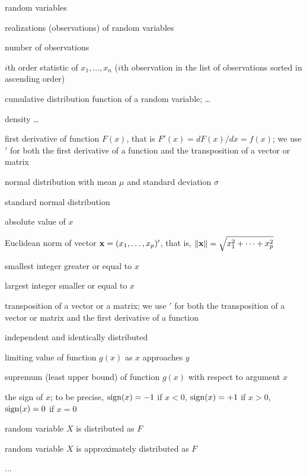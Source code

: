 \begin{description}[leftmargin=6em,style=nextline]
    \item[$X, Y, Z, \dots$]
        random variables
    \item[$x_i, y_i, z_i, \dots$]
        realizations (observations) of random variables
    \item[$n$]
        number of observations
    \item[$x_{(i)}$]
        $i$th order statistic of $x_1, \dots, x_n$ ($i$th observation in the list of observations sorted in ascending order)
    \item[$F(x)$]
        cumulative distribution function of a random variable; \dots
    \item[$f(x)$]
        density \dots
    \item[$F'(x)$]
        first derivative of function $F(x)$, that is $F'(x) = dF(x)/dx = f(x)$;
        we use $'$ for both the first derivative of a function and the
        transposition of a vector or matrix
    \item[$\mathcal{N}(\mu, \sigma)$]
        normal distribution with mean $\mu$ and standard deviation $\sigma$
    \item[$\mathcal{N}(0, 1)$]
        standard normal distribution
    \item[$|x|$]
        absolute value of $x$
    \item[$\Vert\stvec{x}\Vert$]
        Euclidean norm of vector $\mathbf x = (x_1, \dots, x_p)'$, that is, $\Vert\mathbf x\Vert = \sqrt{x_1^2 + \dots + x_p^2}$
    \item[$\lceil x \rceil$]
        smallest integer greater or equal to $x$
    \item[$\lfloor x \rfloor$] 
        largest integer smaller or equal to $x$
    \item[$\stvec{x}'$, $\stmat{X}'$]
        transposition of a vector or a matrix; we use $'$ for both
        the transposition of a vector or matrix and the first derivative of a
        function
    \item[\normalfont i.i.d.]
        independent and identically distributed
    \item[$\displaystyle\lim_{x\rightarrow y} g(x)$]
        limiting value of function $g(x)$ as $x$ approaches $y$
    \item[$\displaystyle\sup_x g(x)$]
        supremum (least upper bound) of function $g(x)$ with respect 
        to argument $x$
    \item[$\sign(x)$]
        the sign of $x$; to be precise, $\operatorname{sign}(x)=-1$ if $x<0$, $\operatorname{sign}(x)=+1$ if $x>0$, $\operatorname{sign}(x)=0$ if $x=0$
    \item[$X\sim F$]
        random variable $X$ is distributed as $F$
    \item[$X\approx F$]
        random variable $X$ is approximately distributed as $F$
    \item[\alert{...}]
        \alert{...}
\end{description}




\endinput
